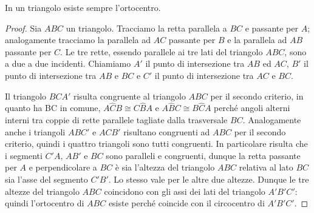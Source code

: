 \begin{teorema}
In un triangolo esiste sempre l'ortocentro.
\end{teorema}

\begin{figure}[htb]
	\centering
\end{figure}

\begin{proof}
Sia $ABC$ un triangolo. Tracciamo la retta parallela a $BC$ e passante per $A$; analogamente tracciamo la parallela ad $AC$ passante per $B$ e la parallela ad $AB$ passante per $C$. Le tre rette, essendo parallele ai tre lati del triangolo $ABC$, sono a due a due incidenti. Chiamiamo $A'$ il punto di intersezione tra $AB$ ed $AC$, $B'$ il punto di intersezione tra $AB$ e $BC$ e $C'$ il punto di intersezione tra $AC$ e $BC$.

Il triangolo $BCA'$ risulta congruente al triangolo $ABC$ per il secondo criterio, in quanto ha BC in comune, $A\widehat{C}B\cong C\widehat{B}A$ e $A\widehat{B}C\cong B\widehat{C}A$ perché angoli alterni interni tra coppie di rette parallele tagliate dalla trasversale $BC$. Analogamente anche i triangoli $ABC'$ e $ACB'$ risultano congruenti ad $ABC$ per il secondo criterio, quindi i quattro triangoli sono tutti congruenti. In particolare risulta che i segmenti $C'A$, $AB'$ e $BC$ sono paralleli e congruenti, dunque la retta passante per $A$ e perpendicolare a $BC$ è sia l'altezza del triangolo $ABC$ relativa al lato $BC$ sia l'asse del segmento $C'B'$. Lo stesso vale per le altre due altezze. Dunque le tre altezze del triangolo $ABC$ coincidono con gli assi dei lati del triangolo $A'B'C'$: quindi l'ortocentro di $ABC$ esiste perché coincide con il circocentro di $A'B'C'$.
\end{proof}


